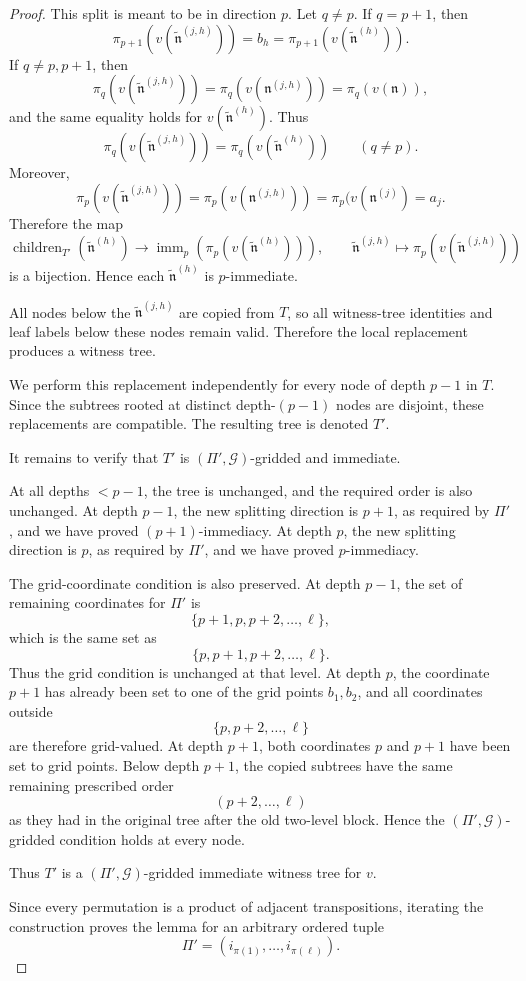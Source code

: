 \documentclass[10pt]{amsart}
\theoremstyle{plain}
\theoremstyle{definition}
\providecommand{\cG}[0]{\ensuremath{\mathcal G}\xspace}
\begin{document}
\begin{proof}
This split is meant to be in direction $p$. Let $q\neq p$.  If
$q=p+1$, then
\[
        \pi_{p+1}(v(\widetilde{\mathfrak{n}}^{(j,h)}))=b_h=\pi_{p+1}(v(\widetilde{\mathfrak{n}}^{(h)})).
\]
If $q\neq p,p+1$, then
\[
        \pi_q(v(\widetilde{\mathfrak{n}}^{(j,h)}))=\pi_q(v(\mathfrak{n}^{(j,h)}))=\pi_q(v(\mathfrak{n})),
\]
and the same equality holds for $v(\widetilde{\mathfrak{n}}^{(h)})$.  Thus
\[
        \pi_q(v(\widetilde{\mathfrak{n}}^{(j,h)}))=\pi_q(v(\widetilde{\mathfrak{n}}^{(h)}))
        \qquad(q\neq p).
\]
Moreover,
\[
        \pi_p(v(\widetilde{\mathfrak{n}}^{(j,h)}))=\pi_p(v(\mathfrak{n}^{(j,h)}))=\pi_p(v(\mathfrak{n}^{(j)})=a_j.
\]
Therefore the map
\[
        \operatorname{children}_{T'}(\widetilde{\mathfrak{n}}^{(h)})
        \longrightarrow
        \operatorname{imm}_{p}(\pi_p(v(\widetilde{\mathfrak{n}}^{(h)}))),
        \qquad
        \widetilde{\mathfrak{n}}^{(j,h)}\longmapsto \pi_p(v(\widetilde{\mathfrak{n}}^{(j,h)}))
\]
is a bijection. Hence each $\widetilde{\mathfrak{n}}^{(h)}$ is $p$-immediate.

All nodes below the $\widetilde{\mathfrak{n}}^{(j,h)}$ are copied from $T$, so all witness-tree
identities and leaf labels below these nodes remain valid. Therefore
the local replacement produces a witness tree.

We perform this replacement independently for every node of depth
$p-1$ in $T$. Since the subtrees rooted at distinct depth-$(p-1)$
nodes are disjoint, these replacements are compatible. The resulting
tree is denoted $T'$.

It remains to verify that $T'$ is $(\Pi',\cG)$-gridded and
immediate.

At all depths $<p-1$, the tree is unchanged, and the required order is
also unchanged.  At depth $p-1$, the new splitting direction is $p+1$,
as required by $\Pi'$, and we have proved $(p+1)$-immediacy.  At depth
$p$, the new splitting direction is $p$, as required by $\Pi'$, and we
have proved $p$-immediacy.

The grid-coordinate condition is also preserved. At depth $p-1$, the
set of remaining coordinates for $\Pi'$ is
\[
        \{p+1,p,p+2,\ldots,\ell\},
\]
which is the same set as
\[
        \{p,p+1,p+2,\ldots,\ell\}.
\]
Thus the grid condition is unchanged at that level. At depth $p$, the
coordinate $p+1$ has already been set to one of the grid points
$b_1,b_2$, and all coordinates outside
\[
        \{p,p+2,\ldots,\ell\}
\]
are therefore grid-valued. At depth $p+1$, both coordinates $p$ and
$p+1$ have been set to grid points. Below depth $p+1$, the copied
subtrees have the same remaining prescribed order
\[
        (p+2,\ldots,\ell)
\]
as they had in the original tree after the old two-level block. Hence
the $(\Pi',\cG)$-gridded condition holds at every node.

Thus $T'$ is a $(\Pi',\cG)$-gridded immediate witness tree for
$v$.

Since every permutation is a product of adjacent transpositions,
iterating the construction proves the lemma for an arbitrary ordered
tuple
\[
        \Pi'=(i_{\pi(1)},\ldots,i_{\pi(\ell)}).
\]
\end{proof}
\end{document}
